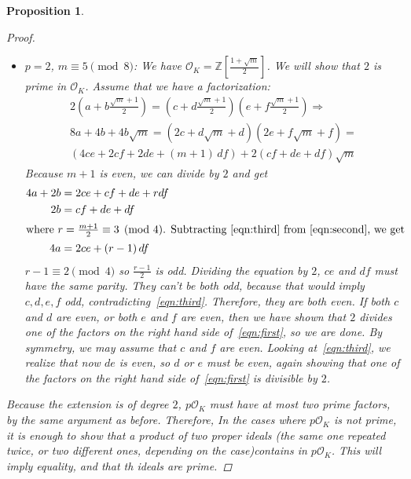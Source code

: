 \documentclass[11pt]{article}
\newtheorem{prop}{Proposition}
\theoremstyle{definition}
\begin{document}
\begin{prop}
\begin{proof}
\begin{itemize}
                \item $p=2$, $m \equiv 5 \pmod 8$: We have $\mathcal{O}_K = \mathbb{Z}\left[\frac{1+\sqrt {m}}{2}\right]$.
                We will show that $2$ is prime in $\mathcal{O}_K$.
                Assume that we have a factorization:
                \begin{gather}
                    2\left(a+b\frac{\sqrt {m}+1}{2}\right) = \left(c+d\frac{\sqrt {m}+1}{2}\right)\left(e+f\frac{\sqrt {m}+1}{2}\right) \Rightarrow \label{eqn:first} \\
                    8a + 4b + 4b\sqrt {m} =
                    (2c+d\sqrt {m}+d)(2e+f\sqrt {m}+f) = \nonumber \\
                    (4ce + 2cf + 2de + (m+1)\,df) + 2(cf+de+df)\sqrt {m} \nonumber
                \end{gather}
                Because $m+1$ is even, we can divide by $2$ and get
                \begin{align}
                    4a + 2b &= 2ce + cf + de + rdf \label{eqn:second} \\
                    2b &= cf+ de + df \label{eqn:third} \\
                \intertext{where $r = \frac{m+1}{2} \equiv 3 \pmod 4$. Subtracting~\eqref{eqn:third} from~\eqref{eqn:second}, we get}
                    4a &= 2ce + (r-1)\,df \nonumber
                \end{align}
                $r - 1 \equiv 2 \pmod 4$ so $\frac{r-1}{2}$ is odd.
                Dividing the equation by $2$,
                $ce$ and $df$ must have the same parity.
                They can't be both odd, because that would imply $c, d, e, f$ odd,
                contradicting~\eqref{eqn:third}.
                Therefore, they are both even.
                If both $c$ and $d$ are even, or both $e$ and $f$ are even, then
                we have shown that $2$ divides one of the factors on the right hand side of~\eqref{eqn:first},
                so we are done.
                By symmetry, we may assume that $c$ and $f$ are even.
                Looking at~\eqref{eqn:third}, we realize that now $de$ is even, so $d$ or $e$ must be even,
                again showing that one of the factors on the right hand side of~\eqref{eqn:first} is divisible by $2$.
            \end{itemize}
            Because the extension is of degree $2$, $p\mathcal{O}_K$ must have at most two prime factors, by the same argument as before.
            Therefore, In the cases where $p\mathcal{O}_K$ is not prime, it is enough to show that a product of two proper ideals
            (the same one repeated twice, or two different ones, depending on the case)contains in $p\mathcal{O}_K$.
            This will imply equality, and that th ideals are prime.



\end{proof}
\end{prop}
\end{document}
